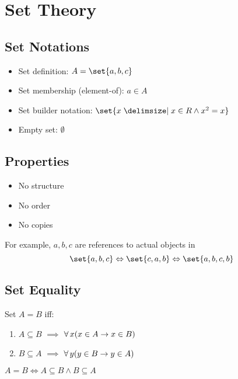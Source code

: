 \chapter{Set Theory}

\section{Set Notations}
\begin{itemize}
    \item Set definition: $A = \set{a, b, c}$
    \item Set membership (element-of): $a \in A$
    \item Set builder notation: $\set{x \given x \in \Real \land x^2 = x}$
    \item Empty set: $\emptyset$
\end{itemize}

\section{Properties}
\begin{itemize}
    \item No structure
    \item No order
    \item No copies
\end{itemize}

For example, $a, b, c$ are references to actual objects in
\begin{equation*}
    \set{a, b, c} \Leftrightarrow \set{c, a, b} \Leftrightarrow \set{a, b, c, b}
\end{equation*}

\section{Set Equality}
\begin{definition}
    Set $A = B$ iff:
    \begin{enumerate}
        \item $A \subseteq B$ $\implies$ $\operatorname{\forall} x (x \in A \to x \in B)$
        \item $B \subseteq A$ $\implies$ $\operatorname{\forall} y (y \in B \to y \in A)$
    \end{enumerate}
\end{definition}

\begin{remark}
    $A = B \Leftrightarrow A \subseteq B \land B \subseteq A$
\end{remark}

